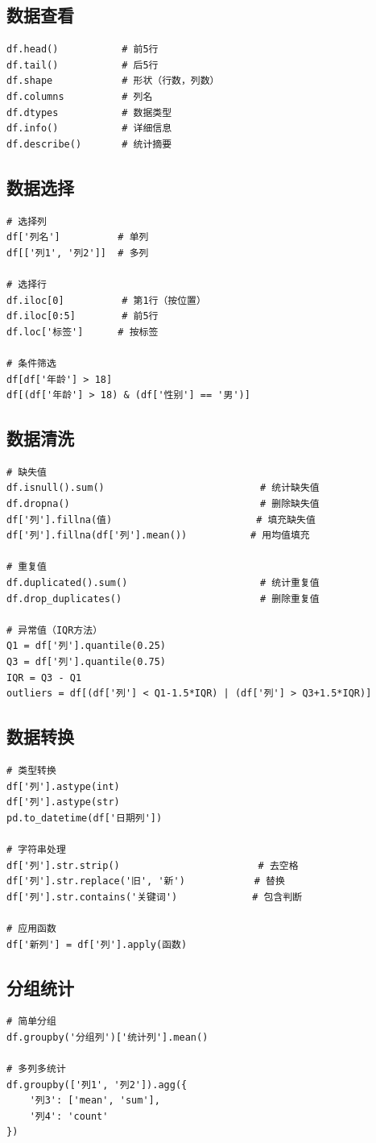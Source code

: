 \documentclass[12pt,a4paper]{article}
\begin{document}
\subsection{数据查看}

\begin{lstlisting}[caption={查看数据}]
df.head()           # 前5行
df.tail()           # 后5行
df.shape            # 形状（行数，列数）
df.columns          # 列名
df.dtypes           # 数据类型
df.info()           # 详细信息
df.describe()       # 统计摘要
\end{lstlisting}

\subsection{数据选择}

\begin{lstlisting}[caption={选择数据}]
# 选择列
df['列名']          # 单列
df[['列1', '列2']]  # 多列

# 选择行
df.iloc[0]          # 第1行（按位置）
df.iloc[0:5]        # 前5行
df.loc['标签']      # 按标签

# 条件筛选
df[df['年龄'] > 18]
df[(df['年龄'] > 18) & (df['性别'] == '男')]
\end{lstlisting}

\subsection{数据清洗}

\begin{lstlisting}[caption={清洗数据}]
# 缺失值
df.isnull().sum()                           # 统计缺失值
df.dropna()                                 # 删除缺失值
df['列'].fillna(值)                         # 填充缺失值
df['列'].fillna(df['列'].mean())           # 用均值填充

# 重复值
df.duplicated().sum()                       # 统计重复值
df.drop_duplicates()                        # 删除重复值

# 异常值（IQR方法）
Q1 = df['列'].quantile(0.25)
Q3 = df['列'].quantile(0.75)
IQR = Q3 - Q1
outliers = df[(df['列'] < Q1-1.5*IQR) | (df['列'] > Q3+1.5*IQR)]
\end{lstlisting}

\subsection{数据转换}

\begin{lstlisting}[caption={转换数据}]
# 类型转换
df['列'].astype(int)
df['列'].astype(str)
pd.to_datetime(df['日期列'])

# 字符串处理
df['列'].str.strip()                        # 去空格
df['列'].str.replace('旧', '新')            # 替换
df['列'].str.contains('关键词')             # 包含判断

# 应用函数
df['新列'] = df['列'].apply(函数)
\end{lstlisting}

\subsection{分组统计}

\begin{lstlisting}[caption={分组统计}]
# 简单分组
df.groupby('分组列')['统计列'].mean()

# 多列多统计
df.groupby(['列1', '列2']).agg({
    '列3': ['mean', 'sum'],
    '列4': 'count'
})
\end{lstlisting}
\end{document}
